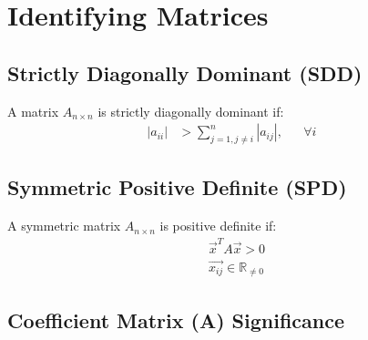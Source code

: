 \section{Identifying Matrices}

	\subsection{Strictly Diagonally Dominant (SDD)}

		A matrix $A_{n \times n}$ is strictly diagonally dominant if:
		\begin{align}
			|a_{ii}| &> \sum_{j = 1, j \neq i}^{n} |a_{ij}|,& &\forall i&
		\end{align}

	\subsection{Symmetric Positive Definite (SPD)}
		A symmetric matrix $A_{n \times n}$ is positive definite if:
		\begin{align}
			\vec{x}^{T} A \vec{x} > 0 \\
			\vec{x_{ij}} \in \mathbb{R}_{\neq 0}
		\end{align}

	\subsection{Coefficient Matrix (A) Significance}
